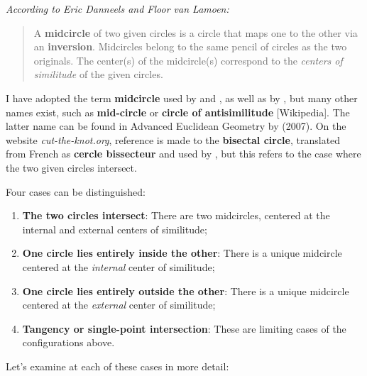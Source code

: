 \medskip

\emph{According to Eric Danneels and Floor van Lamoen:}

\begin{quote}
A \textbf{midcircle} of two given circles is a circle that maps one to the other via an \textbf{inversion}. Midcircles belong to the same pencil of circles as the two originals. The center(s) of the midcircle(s) correspond to the \emph{centers of similitude} of the given circles.
\end{quote}

I have adopted the term \textbf{midcircle} used by  and , as well as by , but many other names exist, such as \textbf{mid-circle} or \textbf{circle of antisimilitude} [Wikipedia]. The latter name can be found in Advanced Euclidean Geometry by  (2007). On the website \textit{cut-the-knot.org}, reference is made to the \textbf{bisectal circle}, translated from French as \textbf{cercle bissecteur} and used by , but this refers to the case where the two given circles intersect.


Four cases can be distinguished:

\begin{enumerate}[label=(\roman*)]
  \item \textbf{The two circles intersect}: There are two midcircles, centered at the internal and external centers of similitude;
  \item \textbf{One circle lies entirely inside the other}: There is a unique midcircle centered at the \emph{internal} center of similitude;
  \item \textbf{One circle lies entirely outside the other}: There is a unique midcircle centered at the \emph{external} center of similitude;
  \item \textbf{Tangency or single-point intersection}: These are limiting cases of the configurations above.
\end{enumerate}


\vspace{1em}
Let’s examine at each of these cases in more detail:


